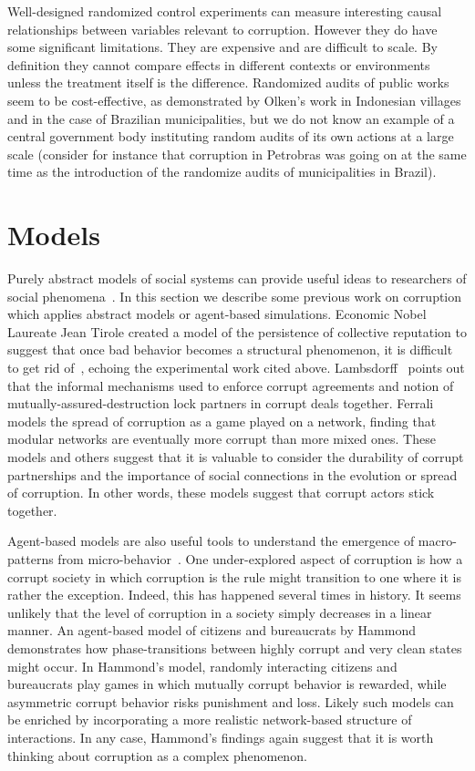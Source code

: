 Well-designed randomized control experiments can measure interesting causal relationships between variables relevant to corruption. However they do have some significant limitations. They are expensive and are difficult to scale. By definition they cannot compare effects in different contexts or environments unless the treatment itself is the difference. Randomized audits of public works seem to be cost-effective, as demonstrated by Olken's work in Indonesian villages and in the case of Brazilian municipalities, but we do not know an example of a central government body instituting random audits of its own actions at a large scale (consider for instance that corruption in Petrobras was going on at the same time as the introduction of the randomize audits of municipalities in Brazil). 

\section{Models}

Purely abstract models of social systems can provide useful ideas to researchers of social phenomena~\cite{miller2009complex}. In this section we describe some previous work on corruption which applies abstract models or agent-based simulations. Economic Nobel Laureate Jean Tirole created a model of the persistence of collective reputation to suggest that once bad behavior becomes a structural phenomenon, it is difficult to get rid of~\cite{Tirole1996}, echoing the experimental work cited above. Lambsdorff~\cite{Lambsdorff2002} points out that the informal mechanisms used to enforce corrupt agreements and notion of mutually-assured-destruction lock partners in corrupt deals together. Ferrali~\cite{ferrali2018corruption} models the spread of corruption as a game played on a network, finding that modular networks are eventually more corrupt than more mixed ones. These models and others suggest that it is valuable to consider the durability of corrupt partnerships and the importance of social connections in the evolution or spread of corruption. In other words, these models suggest that corrupt actors stick together.

Agent-based models are also useful tools to understand the emergence of macro-patterns from micro-behavior~\cite{macy1998evolution}. One under-explored aspect of corruption is how a corrupt society in which corruption is the rule might transition to one where it is rather the exception. Indeed, this has happened several times in history. It seems unlikely that the level of corruption in a society simply decreases in a linear manner. An agent-based model of citizens and bureaucrats by Hammond~\cite{Hammond2000} demonstrates how phase-transitions between highly corrupt and very clean states might occur. In Hammond's model, randomly interacting citizens and bureaucrats play games in which mutually corrupt behavior is rewarded, while asymmetric corrupt behavior risks punishment and loss. Likely such models can be enriched by incorporating a more realistic network-based structure of interactions. In any case, Hammond's findings again suggest that it is worth thinking about corruption as a complex phenomenon.


